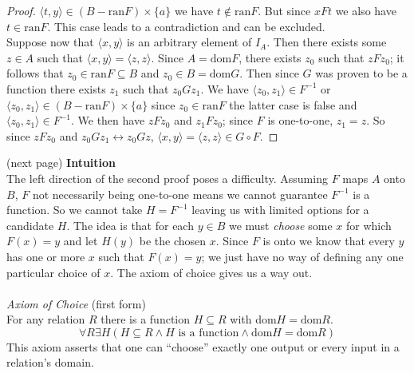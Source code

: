 \documentclass{report}
\begin{document}
\begin{proof}
$\langle t,y\rangle\in(B-\text{ran}F)\times\{a\}$ we have $t\notin\text{ran}F$. But since $xFt$ we also have $t\in\text{ran}F$. This case leads to a contradiction and can be excluded.\\
\indent Suppose now that $\langle x,y\rangle$ is an arbitrary element of $I_A$. Then there exists some $z\in A$ such that 
$\langle x,y\rangle=\langle z,z\rangle$. Since $A=\text{dom}F$, there exists $z_0$ such that $zFz_0$; it follows that $z_0\in\text{ran}F\subseteq B$ and $z_0\in B=\text{dom}G$. 
Then since $G$ was proven to be a function there exists $z_1$ such that $z_0Gz_1$. We have 
$\langle z_0,z_1\rangle\in F^{-1}$ or $\langle z_0,z_1\rangle\in (B-\text{ran}F)\times\{a\}$
since $z_0\in\text{ran}F$ the latter case is false and $\langle z_0,z_1\rangle\in F^{-1}$.
We then have $zFz_0$ and $z_1Fz_0$; since $F$ is one-to-one, $z_1=z$. 
So since $zFz_0$ and $z_0Gz_1\leftrightarrow z_0Gz$, 
$\langle x,y\rangle=\langle z,z\rangle\in G\circ F$.
\end{proof}
\noindent(next page)\newpage
\noindent\textbf{Intuition}\\
The left direction of the second proof poses a difficulty. Assuming $F$ maps $A$ onto $B$, $F$ not necessarily being one-to-one means we cannot guarantee $F^{-1}$ is a function.
So we cannot take $H=F^{-1}$ leaving us with limited options for a candidate $H$. The idea is that for each $y\in B$ we must \textit{choose} some $x$ for which $F(x)=y$ and let $H(y)$ be the chosen
$x$. Since $F$ is onto we know that every $y$ has one or more $x$ such that $F(x)=y$; we just have no way of defining any one particular choice of $x$. The axiom of choice gives us a way out.\\
\vspace{1mm}\\
\textit{Axiom of Choice} (first form)\\
For any relation $R$ there is a function $H\subseteq R$ with dom$H=\text{dom}R$.\
\begin{equation*}
\forall R\exists H(H\subseteq R\land\text{$H$ is a function}\land\text{dom}H=\text{dom}R)
\end{equation*}
This axiom asserts that one can ``choose'' exactly one output or every input in a relation's domain.
\end{document}
